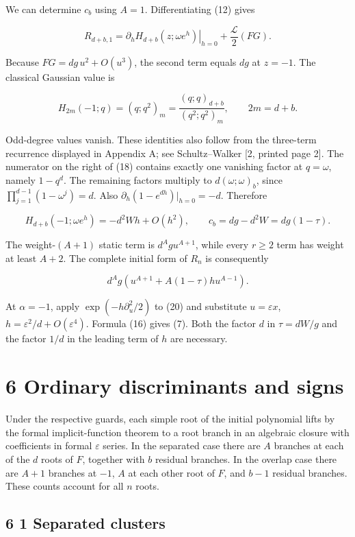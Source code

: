 \documentclass[
  11pt,
]{article}
\begin{document}
We can determine \(c_b\) using \(A=1\). Differentiating (12) gives

\[
R_{d+b,1}=\left.\partial_hH_{d+b}(z;\omega e^h)\right|_{h=0}
+\frac{\mathcal L}{2}(FG).
\]

Because \(FG=dg\,u^2+O(u^3)\), the second term equals \(dg\) at
\(z=-1\). The classical Gaussian value is

\[
H_{2m}(-1;q)=(q;q^2)_m
=\frac{(q;q)_{d+b}}{(q^2;q^2)_m},\qquad 2m=d+b. \tag{18}
\]

Odd-degree values vanish. These identities also follow from the
three-term recurrence displayed in Appendix A; see Schultz--Walker {[}2,
printed page 2{]}. The numerator on the right of (18) contains exactly
one vanishing factor at \(q=\omega\), namely \(1-q^d\). The remaining
factors multiply to \(d(\omega;\omega)_b\), since
\(\prod_{j=1}^{d-1}(1-\omega^j)=d\). Also
\(\partial_h(1-e^{dh})|_{h=0}=-d\). Therefore

\[
H_{d+b}(-1;\omega e^h)=-d^2Wh+O(h^2),
\qquad c_b=dg-d^2W=dg(1-\tau). \tag{19}
\]

The weight-\((A+1)\) static term is \(d^Agu^{A+1}\), while every
\(r\geq2\) term has weight at least \(A+2\). The complete initial form
of \(R_n\) is consequently

\[
d^Ag\left(u^{A+1}+A(1-\tau)hu^{A-1}\right). \tag{20}
\]

At \(\alpha=-1\), apply \(\exp(-h\partial_u^2/2)\) to (20) and
substitute \(u=\varepsilon x\), \(h=\varepsilon^2/d+O(\varepsilon^4)\).
Formula (16) gives (7). Both the factor \(d\) in \(\tau=dW/g\) and the
factor \(1/d\) in the leading term of \(h\) are necessary.

\section{6 Ordinary discriminants and
signs}\label{ordinary-discriminants-and-signs}

Under the respective guards, each simple root of the initial polynomial
lifts by the formal implicit-function theorem to a root branch in an
algebraic closure with coefficients in formal \(\varepsilon\) series. In
the separated case there are \(A\) branches at each of the \(d\) roots
of \(F\), together with \(b\) residual branches. In the overlap case
there are \(A+1\) branches at \(-1\), \(A\) at each other root of \(F\),
and \(b-1\) residual branches. These counts account for all \(n\) roots.

\subsection{6 1 Separated clusters}\label{separated-clusters}
\end{document}
